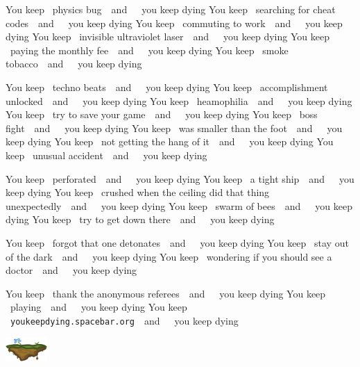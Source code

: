\documentclass[twocolumn]{article}
\newcommand\ykd[1]{You keep ~{#1}~~and~~~you keep dying\qquad}
\begin{document}
\ykd{physics bug}
\ykd{searching for cheat codes}
\ykd{commuting to work}
\ykd{invisible ultraviolet laser}
\ykd{paying the monthly fee}
\ykd{smoke tobacco}

\vspace{0.45in}
\ykd{techno beats}
\ykd{accomplishment unlocked}
\ykd{heamophilia}
\ykd{try to save your game}
\ykd{boss fight}
\ykd{was smaller than the foot}
\ykd{not getting the hang of it}
\ykd{unusual accident}

\ykd{perforated}
\ykd{a tight ship}
\ykd{crushed when the ceiling did that thing unexpectedly}
\ykd{swarm of bees}
\ykd{try to get down there}

\vspace{0.25in}
\ykd{forgot that one detonates}
\ykd{stay out of the dark}
\ykd{wondering if you should see a doctor}

\vspace{0.25in}
\ykd{thank the anonymous referees}
\ykd{playing}
\ykd{{\tt youkeepdying.spacebar.org}}

\vspace{0.4in}
\qquad\qquad\qquad\includegraphics[width=0.12\textwidth]{platform}
\end{document}
